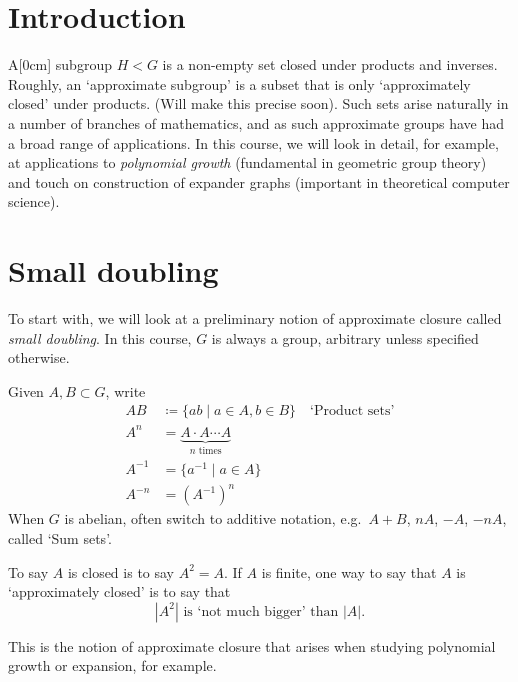 \documentclass{article}
\numberwithin{equation}{section}
\begin{document}
\maketitle

\tableofcontents

\clearpage
\section{Introduction}
A[0cm] subgroup $H < G$ is a non-empty set closed under products and inverses.
Roughly, an `approximate subgroup' is a subset that is only `approximately closed' under products.  (Will make this precise soon).
Such sets arise naturally in a number of branches of mathematics, and as such approximate groups have had a broad range of applications.
In this course, we will look in detail, for example, at applications to \emph{polynomial growth} (fundamental in geometric group theory) and touch on construction of expander graphs (important in theoretical computer science).

\clearpage
\section{Small doubling}
To start with, we will look at a preliminary notion of approximate closure called \emph{small doubling}.
In this course, $G$ is always a group, arbitrary unless specified otherwise.
\begin{notation}
Given $A,B \subset G$, write
\begin{align*}
  AB &\coloneqq \{ab \mid a \in A, b \in B\} \quad \text{`Product sets'} \\
  A^n &= \underbrace{A \cdot A \dotsm A}_{n\text{ times}} \\
  A^{-1} &= \{a^{-1} \mid a \in A\} \\
  A^{-n} &= (A^{-1})^n
\end{align*}
When $G$ is abelian, often switch to additive notation, e.g.\ $A + B$, $nA$, $-A$, $-nA$, called `Sum sets'.
\end{notation}

To say $A$ is closed is to say $A^2 = A$. If $A$ is finite, one way to say that $A$ is `approximately closed' is to say that
\begin{equation*}
  |A^2| \text{ is `not much bigger' than } |A|.
\end{equation*}

This is the notion of approximate closure that arises when studying polynomial growth or expansion, for example.
\end{document}
